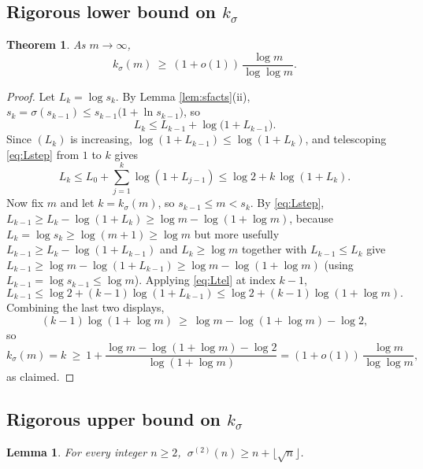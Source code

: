 \documentclass{amsart}
\newtheorem{theorem}{Theorem}
\newtheorem{lemma}{Lemma}
\theoremstyle{definition}
\begin{document}
\subsection{Rigorous lower bound on $k_\sigma$}

\begin{theorem}\label{thm:klow}
As $m\to\infty$,
\[
k_\sigma(m)\ \ge\ (1+o(1))\,\frac{\log m}{\log\log m}.
\]
\end{theorem}

\begin{proof}
Let $L_k=\log s_k$. By Lemma \ref{lem:sfacts}(ii),
$s_{k}=\sigma(s_{k-1})\le s_{k-1}\bigl(1+\ln s_{k-1}\bigr)$, so
\begin{equation}\label{eq:Lstep}
L_{k}\le L_{k-1}+\log\!\bigl(1+L_{k-1}\bigr).
\end{equation}
Since $(L_k)$ is increasing, $\log(1+L_{k-1})\le\log(1+L_{k})$, and telescoping
\eqref{eq:Lstep} from $1$ to $k$ gives
\begin{equation}\label{eq:Ltel}
L_k\le L_0+\sum_{j=1}^{k}\log(1+L_{j-1})
     \le \log 2 + k\,\log(1+L_k).
\end{equation}
Now fix $m$ and let $k=k_\sigma(m)$, so $s_{k-1}\le m<s_k$. By \eqref{eq:Lstep},
$L_{k-1}\ge L_k-\log(1+L_k)\ge \log m-\log(1+\log m)$, because
$L_k=\log s_k\ge\log(m+1)\ge\log m$ but more usefully
$L_{k-1}\ge L_k-\log(1+L_{k-1})$ and $L_k\ge\log m$ together with
$L_{k-1}\le L_k$ give
$L_{k-1}\ge\log m-\log(1+L_{k-1})\ge\log m-\log(1+\log m)$
(using $L_{k-1}=\log s_{k-1}\le\log m$). Applying \eqref{eq:Ltel} at index
$k-1$,
\[
L_{k-1}\le \log 2+(k-1)\log(1+L_{k-1})\le\log2+(k-1)\log(1+\log m).
\]
Combining the last two displays,
\[
(k-1)\log(1+\log m)\ \ge\ \log m-\log(1+\log m)-\log2,
\]
so
\[
k_\sigma(m)=k\ \ge\ 1+\frac{\log m-\log(1+\log m)-\log2}{\log(1+\log m)}
=(1+o(1))\,\frac{\log m}{\log\log m},
\]
as claimed.
\end{proof}

\subsection{Rigorous upper bound on $k_\sigma$}

\begin{lemma}\label{lem:twostep}
For every integer $n\ge2$, $\ \sigma^{(2)}(n)\ge n+\lfloor\sqrt n\rfloor$.
\end{lemma}
\end{document}
